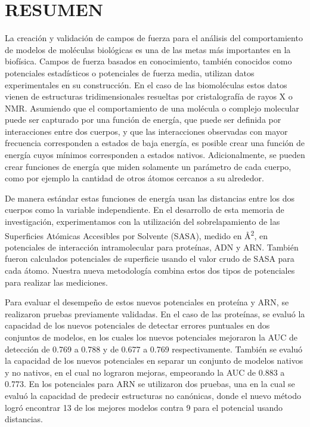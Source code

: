 \newpage
\section*{RESUMEN}
\begin{singlespace}
\par
La creación y validación de campos de fuerza para el análisis del comportamiento de modelos de moléculas biológicas es una de las metas más importantes en la biofísica. 
Campos de fuerza basados en conocimiento, también conocidos como potenciales estadísticos o potenciales de fuerza media, utilizan datos experimentales en su construcción. 
En el caso de las biomoléculas estos datos vienen de estructuras tridimensionales resueltas por cristalografía de rayos X o NMR.
Asumiendo que el comportamiento de una molécula o complejo molecular puede ser capturado por una función de energía, que puede ser definida por interacciones entre dos cuerpos, y que las interacciones observadas con mayor frecuencia corresponden a estados de baja energía, es posible crear una función de energía cuyos mínimos corresponden a estados nativos.
Adicionalmente, se pueden crear funciones de energía que miden solamente un parámetro de cada cuerpo, como por ejemplo la cantidad de otros átomos cercanos a su alrededor.
\par
De manera estándar estas funciones de energía usan las distancias entre los dos cuerpos como la variable independiente. 
En el desarrollo de esta memoria de investigación, experimentamos con la utilización del sobrelapamiento de las Superficies Atómicas Accesibles por Solvente (SASA), medido en \si{\angstrom}\textsuperscript{2}, en potenciales de interacción intramolecular para proteínas, ADN y ARN. 
También fueron calculados potenciales de superficie usando el valor crudo de SASA para cada átomo.
Nuestra nueva metodología combina estos dos tipos de potenciales para realizar las mediciones.
\par
Para evaluar el desempeño de estos nuevos potenciales en proteína y ARN, se realizaron pruebas previamente validadas. 
En el caso de las proteínas, se evaluó la capacidad de los nuevos potenciales de detectar errores puntuales en dos conjuntos de modelos, en los cuales los nuevos potenciales mejoraron la AUC de detección de 0.769 a 0.788 y de 0.677 a 0.769 respectivamente. 
También se evaluó la capacidad de los nuevos potenciales en separar un conjunto de modelos nativos y no nativos, en el cual no lograron mejoras, empeorando la AUC de 0.883 a 0.773. 
En los potenciales para ARN se utilizaron dos pruebas, una en la cual se evaluó la capacidad de predecir estructuras no canónicas, donde el nuevo método logró encontrar 13 de los mejores modelos contra 9 para el potencial usando distancias.

\end{singlespace}
